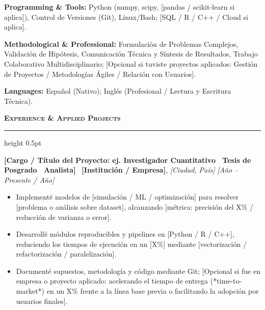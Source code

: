 \documentclass[11pt]{article}
\newcommand{\cvsection}[1]{%
  \vspace{0.35cm}%
  {\bfseries\large\scshape #1}%
  \vspace{0.06cm}%
  {\color{rulecolor}\hrule height 0.5pt}%
  \vspace{0.2cm}%
}
\begin{document}
\vspace{0.1cm}
\textbf{Programming \& Tools:} Python (numpy, scipy, [pandas / scikit-learn si aplica]), Control de Versiones (Git), Linux/Bash; [SQL / R / C++ / Cloud si aplica].

\vspace{0.1cm}
\textbf{Methodological \& Professional:} Formulación de Problemas Complejos, Validación de Hipótesis, Comunicación Técnica y Síntesis de Resultados, Trabajo Colaborativo Multidisciplinario; [Opcional si tuviste proyectos aplicados: Gestión de Proyectos / Metodologías Ágiles / Relación con Usuarios].

\vspace{0.1cm}
\textbf{Languages:} Español (Nativo); Inglés (Profesional / Lectura y Escritura Técnica).

\cvsection{Experience \& Applied Projects}

\textbf{[Cargo / Título del Proyecto: ej. Investigador Cuantitativo \textbar \ Tesis de Posgrado \textbar \ Analista]} \textbar \ \textbf{[Institución / Empresa]}, \textit{[Ciudad, País]} \hfill \textit{[Año -- Presente / Año]}
\begin{itemize}[leftmargin=0.4cm, itemsep=2pt, parsep=0pt, topsep=3pt] \small
  \item Implementé modelos de [simulación / ML / optimización] para resolver [problema o análisis sobre dataset], alcanzando [métrica: precisión del X\% / reducción de varianza o error].
  \item Desarrollé módulos reproducibles y pipelines en [Python / R / C++], reduciendo los tiempos de ejecución en un [X\%] mediante [vectorización / refactorización / paralelización].
  \item Documenté supuestos, metodología y código mediante Git; [Opcional si fue en empresa o proyecto aplicado: acelerando el tiempo de entrega (*time-to-market*) en un X\% frente a la línea base previa o facilitando la adopción por usuarios finales].
\end{itemize}
\end{document}
